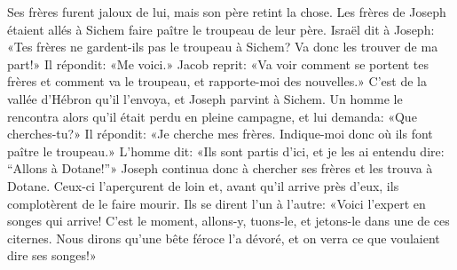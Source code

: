 Ses frères furent jaloux de lui, mais son père retint la chose.
Les frères de Joseph étaient allés à Sichem
	faire paître le troupeau de leur père.
Israël dit à Joseph: «Tes frères ne gardent-ils pas le troupeau à Sichem?
	Va donc les trouver de ma part!»
	Il répondit: «Me voici.»
Jacob reprit: «Va voir comment se portent tes frères et comment va le troupeau,
	et rapporte-moi des nouvelles.»
C’est de la vallée d’Hébron qu’il l’envoya, et Joseph parvint à Sichem.
Un homme le rencontra alors qu’il était perdu en pleine campagne,
	et lui demanda: «Que cherches-tu?»
Il répondit: «Je cherche mes frères.
	Indique-moi donc où ils font paître le troupeau.»
L’homme dit: «Ils sont partis d’ici,
	et je les ai entendu dire: “Allons à Dotane!”»
	Joseph continua donc à chercher ses frères et les trouva à Dotane.
Ceux-ci l’aperçurent de loin
	et, avant qu’il arrive près d’eux, ils complotèrent de le faire mourir.
Ils se dirent l’un à l’autre: «Voici l’expert en songes qui arrive!
	C’est le moment, allons-y, tuons-le,
	et jetons-le dans une de ces citernes.
Nous dirons qu’une bête féroce l’a dévoré,
	et on verra ce que voulaient dire ses songes!»
